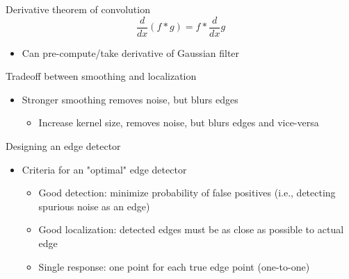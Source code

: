 Derivative theorem of convolution
\[\frac{d}{dx}(f * g) = f * \frac{d}{dx}g\]
\begin{itemize}
    \item Can pre-compute/take derivative of Gaussian filter
\end{itemize}
Tradeoff between smoothing and localization
\begin{itemize}
    \item Stronger smoothing removes noise, but blurs edges
    \begin{itemize}
        \item Increase kernel size, removes noise, but blurs edges and vice-versa
    \end{itemize}
\end{itemize}
Designing an edge detector
\begin{itemize}
    \item Criteria for an "optimal" edge detector
    \begin{itemize}
        \item Good detection: minimize probability of false positives (i.e., detecting spurious noise as an edge)
        \item Good localization: detected edges must be as close as possible to actual edge
        \item Single response: one point for each true edge point (one-to-one)
    \end{itemize}
\end{itemize}
